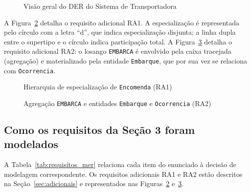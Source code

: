 \begin{figure}[H]
\centering
\resizebox{\linewidth}{!}{}
\caption{Visão geral do DER do Sistema de Transportadora}
\label{fig:der}
\end{figure}

A Figura~\ref{fig:hierarquia} detalha o requisito adicional RA1. A especialização é representada pelo círculo com a letra ``d'', que indica especialização disjunta; a linha dupla entre o supertipo e o círculo indica participação total. A Figura~\ref{fig:agregacao} detalha o requisito adicional RA2: o losango \texttt{EMBARCA} é envolvido pela caixa tracejada (agregação) e materializado pela entidade \texttt{Embarque}, que por sua vez se relaciona com \texttt{Ocorrencia}.

\begin{figure}[H]
\centering
\resizebox{0.82\linewidth}{!}{}
\caption{Hierarquia de especialização de \texttt{Encomenda} (RA1)}
\label{fig:hierarquia}
\end{figure}

\begin{figure}[H]
\centering
\resizebox{0.78\linewidth}{!}{}
\caption{Agregação \texttt{EMBARCA} e entidades \texttt{Embarque} e \texttt{Ocorrencia} (RA2)}
\label{fig:agregacao}
\end{figure}

\subsection{Como os requisitos da Seção 3 foram modelados}

A Tabela~\ref{tab:requisitos_mer} relaciona cada item do enunciado à decisão de modelagem correspondente. Os requisitos adicionais RA1 e RA2 estão descritos na Seção~\ref{sec:adicionais} e representados nas Figuras~\ref{fig:hierarquia} e~\ref{fig:agregacao}.

